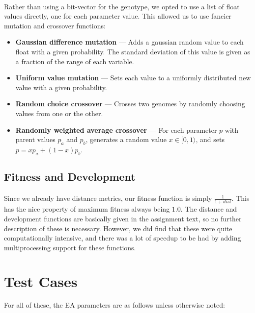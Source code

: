 \documentclass[a4paper,12pt]{article}
\begin{document}
\paragraph{}Rather than using a bit-vector for the genotype, we opted to use a list of float values directly, one for each parameter value. This allowed us to use fancier mutation and crossover functions:
\begin{itemize}
\item{\textbf{Gaussian difference mutation} --- Adds a gaussian random value to each float with a given probability. The standard deviation of this value is given as a fraction of the range of each variable.}
\item{\textbf{Uniform value mutation} --- Sets each value to a uniformly distributed new value with a given probability.}
\item{\textbf{Random choice crossover} --- Crosses two genomes by randomly choosing values from one or the other.}
\item{\textbf{Randomly weighted average crossover} --- For each parameter $p$ with parent values $p_a$ and $p_b$, generates a random value $x \in [ 0, 1 \rangle$, and sets $p = x p_a + (1-x)p_b$.}
\end{itemize}

\subsection{Fitness and Development}

\paragraph{}Since we already have distance metrics, our fitness function is simply $\frac{1}{1+dist}$. This has the nice property of maximum fitness always being $1.0$. The distance and development functions are basically given in the assignment text, so no further description of these is necessary. However, we did find that these were quite computationally intensive, and there was a lot of speedup to be had by adding multiprocessing support for these functions.

\section{Test Cases}

\paragraph{}For all of these, the EA parameters are as follows unless otherwise noted: \\
\end{document}
